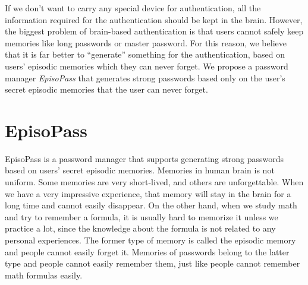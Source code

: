 \documentclass{sigchi}
\begin{document}
If we don't want to carry any special device for authentication,
all the information required for the authentication should be
kept in the brain.
%
However, the biggest problem of brain-based authentication is that
users cannot safely keep memories like long passwords or master password.
For this reason, we believe that
it is far better to ``generate'' something for the authentication,
based on users' episodic memories which they can never forget.
%
%
We propose a password manager \textit{EpisoPass} that generates strong passwords
based only on the user's secret episodic memories that the user can never forget.

\section{EpisoPass}

EpisoPass is a password manager that supports generating
strong passwords based on users' secret episodic memories.
%
%
Memories in human brain is not uniform.
Some memories are very short-lived, and others are unforgettable.
When we have a very impressive experience,
that memory will stay in the brain for a long time and
cannot easily disappear.
On the other hand, when we study math and try to remember a formula,
it is usually hard to memorize it unless we practice a lot,
since the knowledge about the formula is not related to
any personal experiences.
The former type of memory is called the episodic memory and
people cannot easily forget it.
Memories of passwords belong to the latter type and
people cannot easily remember them, just like people cannot
remember math formulas easily.
%
\end{document}

